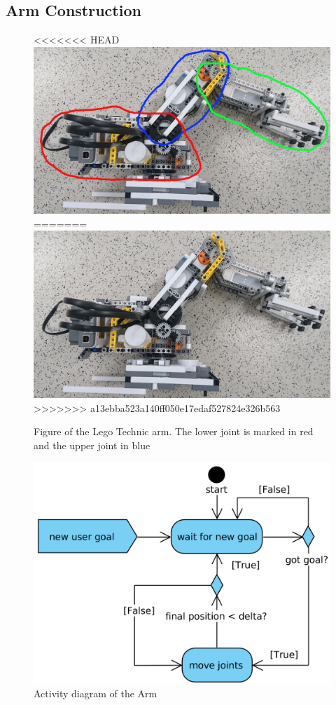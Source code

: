 \documentclass[conference]{IEEEtran}
\begin{document}
\subsection{Arm Construction}\label{sec:construction}
\begin{figure}[bt] 
	\centering
<<<<<<< HEAD
	\includegraphics[width=\textwidth/2]{img/arm_full_circles}
=======
	\includegraphics[width=\textwidth/2]{img/arm_full}
>>>>>>> a13ebba523a140ff050e17edaf527824e326b563
	\caption[caption]{Figure of the Lego Technic arm. The lower joint is marked in red and the upper joint in blue}
	\label{fig:arm_full}
\end{figure}
\begin{figure}[bt] 
	\centering
	\includegraphics[width=\textwidth/2]{img/control_arm.png}
	\caption[caption]{Activity diagram of the Arm}
\label{fig:activitiy_arm}
\end{figure}
\end{document}

